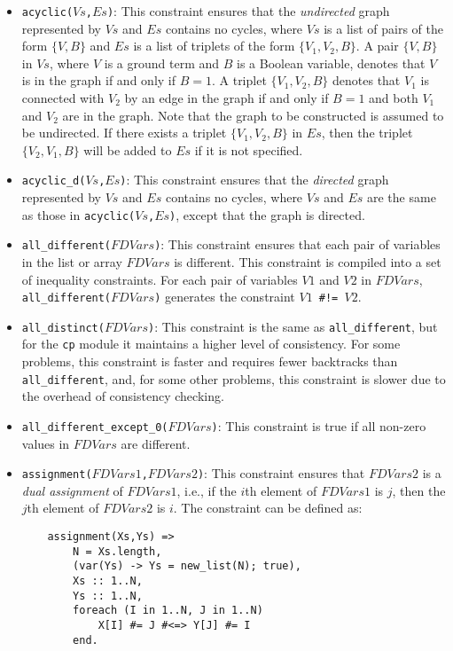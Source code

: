 \begin{itemize}
\item \texttt{acyclic($Vs$,$Es$)}: This constraint ensures that the \textit{undirected} graph represented by $Vs$ and $Es$ contains no cycles, where $Vs$ is a list of pairs of the form $\{V,B\}$ and $Es$ is a list of triplets of the form $\{V_1,V_2,B\}$. A pair $\{V,B\}$ in $Vs$, where $V$ is a ground term and $B$ is a Boolean variable, denotes that $V$ is in the graph if and only if $B = 1$. A triplet $\{V_1,V_2,B\}$ denotes that $V_1$ is connected with $V_2$  by an edge in the graph if and only if $B = 1$ and both $V_1$ and $V_2$ are in the graph. Note that the graph to be constructed is assumed to be undirected. If there exists a triplet $\{V_1,V_2,B\}$ in $Es$, then the triplet $\{V_2,V_1,B\}$ will be added to $Es$ if it is not specified.

\item \texttt{acyclic\_d($Vs$,$Es$)}: This constraint ensures that the \textit{directed} graph represented by $Vs$ and $Es$ contains no cycles, where $Vs$ and $Es$ are the same as those in \texttt{acyclic($Vs$,$Es$)}, except that the graph is directed.
    
\item \texttt{all\_different($FDVars$)}: This constraint ensures that each pair of variables in the list or array $FDVars$ is different. This constraint is compiled into a set of inequality constraints. For each pair of variables $V1$ and $V2$ in $FDVars$, \texttt{all\_different($FDVars$)} generates the constraint {\tt $V1$ \verb+#!=+ $V2$}.

\item \texttt{all\_distinct($FDVars$)}: This constraint is the same as \texttt{all\_different}, but for the \texttt{cp} module it maintains a higher level of consistency. For some problems, this constraint is faster and requires fewer backtracks than \texttt{all\_different}, and, for some other problems, this constraint is slower due to the overhead of consistency checking.

\item \texttt{all\_different\_except\_0($FDVars$)}: This constraint is true if all non-zero values in $FDVars$ are different.
\item \texttt{assignment($FDVars1$,$FDVars2$)}: This constraint ensures that $FDVars2$ is a \emph{dual assignment} of $FDVars1$, i.e., if the $i$th element of $FDVars1$ is $j$, then the $j$th element of $FDVars2$ is $i$. The constraint can be defined as:
\begin{verbatim}
    assignment(Xs,Ys) =>
        N = Xs.length,
        (var(Ys) -> Ys = new_list(N); true),
        Xs :: 1..N,
        Ys :: 1..N,
        foreach (I in 1..N, J in 1..N)
            X[I] #= J #<=> Y[J] #= I
        end.
\end{verbatim}


\end{itemize}
